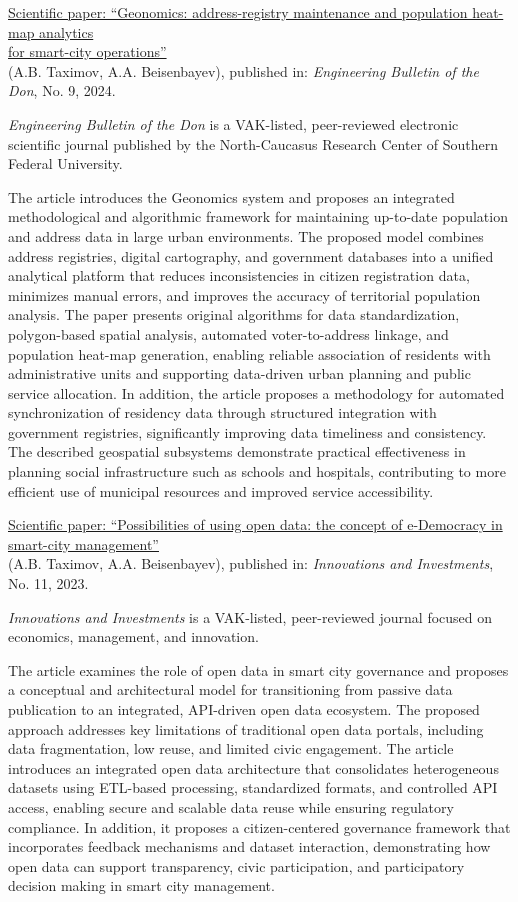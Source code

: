 \noindent\underline{Scientific paper: ``Geonomics: address-registry maintenance and population heat-map analytics} \\
\underline{for smart-city operations''} \\
(A.B. Taximov, A.A. Beisenbayev), published in: \emph{Engineering Bulletin of the Don}, No. 9, 2024.

\emph{Engineering Bulletin of the Don} is a VAK-listed, peer-reviewed electronic scientific journal published by the North-Caucasus Research Center of Southern Federal University.

The article introduces the Geonomics system and proposes an integrated methodological and algorithmic framework for maintaining up-to-date population and address data in large urban environments. The proposed model combines address registries, digital cartography, and government databases into a unified analytical platform that reduces inconsistencies in citizen registration data, minimizes manual errors, and improves the accuracy of territorial population analysis. The paper presents original algorithms for data standardization, polygon-based spatial analysis, automated voter-to-address linkage, and population heat-map generation, enabling reliable association of residents with administrative units and supporting data-driven urban planning and public service allocation.
In addition, the article proposes a methodology for automated synchronization of residency data through structured integration with government registries, significantly improving data timeliness and consistency. The described geospatial subsystems demonstrate practical effectiveness in planning social infrastructure such as schools and hospitals, contributing to more efficient use of municipal resources and improved service accessibility.
\bigskip

\noindent\underline{Scientific paper: ``Possibilities of using open data: the concept of e-Democracy in smart-city management''} \\
(A.B. Taximov, A.A. Beisenbayev), published in: \emph{Innovations and Investments}, No. 11, 2023.

\emph{Innovations and Investments} is a VAK-listed, peer-reviewed journal focused on economics, management, and innovation.

The article examines the role of open data in smart city governance and proposes a conceptual and architectural model for transitioning from passive data publication to an integrated, API-driven open data ecosystem. The proposed approach addresses key limitations of traditional open data portals, including data fragmentation, low reuse, and limited civic engagement.
The article introduces an integrated open data architecture that consolidates heterogeneous datasets using ETL-based processing, standardized formats, and controlled API access, enabling secure and scalable data reuse while ensuring regulatory compliance. In addition, it proposes a citizen-centered governance framework that incorporates feedback mechanisms and dataset interaction, demonstrating how open data can support transparency, civic participation, and participatory decision making in smart city management.
\bigskip

